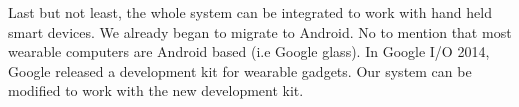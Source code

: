 Last but not least, the whole system can be integrated to work with hand held smart devices. We already began to migrate to Android. No to mention that most wearable computers are Android based (i.e Google glass). In Google I/O 2014, Google released a development kit for wearable gadgets. Our system can be modified to work with the new development kit.
